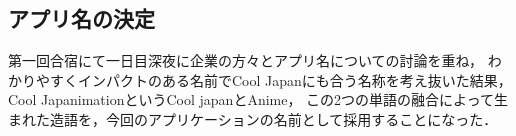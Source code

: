 \subsection{アプリ名の決定}
\par
第一回合宿にて一日目深夜に企業の方々とアプリ名についての討論を重ね，
わかりやすくインパクトのある名前でCool Japanにも合う名称を考え抜いた結果，Cool JapanimationというCool japanとAnime，
この2つの単語の融合によって生まれた造語を，今回のアプリケーションの名前として採用することになった．
